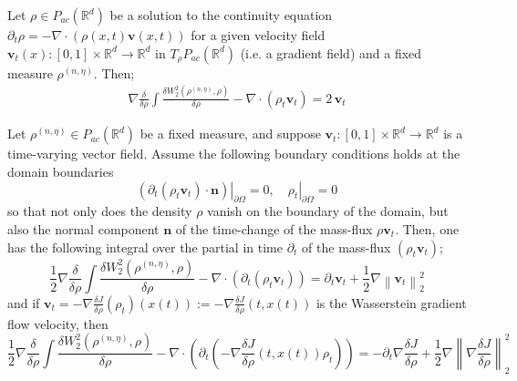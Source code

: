 \documentclass[10pt,a4paper]{amsart}
\newcommand{\wagrad}{\nabla \frac{\delta J}{\delta \rho}}
\begin{document}
\begin{prop}\label{prop:grad_first_var}
Let $\rho \in {P}_{ac}(\mathbb{R}^{d})$ be a solution to the continuity equation $\partial_{t} \rho =- \nabla \cdot (\rho(x,t) \mathbf{v}(x,t))$ for a given velocity field $\mathbf{v}_{t}(x): [0,1] \times \mathbb{R}^{d}  \to \mathbb{R}^{d}$ in $T_{\rho} P_{ac}(\mathbb{R}^{d})$ (i.e. a gradient field) and a fixed measure $\rho^{(n,\eta)}$. Then;
\begin{align*}
    \nabla \frac{\delta}{\delta \rho} \int \frac{\delta W_{2}^{2}(\rho^{(n,\eta)}, \rho) }{\delta \rho} -\nabla\cdot \left( \rho_{t} \mathbf{v}_t \right) = 2 \,\mathbf{v}_t
\end{align*}
\end{prop}

\begin{prop}
    Let $\rho^{(n,\eta)} \in {P}_{ac}(\mathbb{R}^{d})$ be a fixed measure, and suppose $\mathbf{v}_{t}: [0,1] \times \mathbb{R}^{d}  \to \mathbb{R}^{d}$ is a time-varying vector field. Assume the following boundary conditions holds at the domain boundaries
    \[ \left. \left( \partial_{t} ( \rho_{t} \mathbf{v}_{t} ) \cdot \bm{n}\right) \right|_{\partial \Omega}  = 0, \quad \left. \rho_{t} \right|_{\partial \Omega} = 0\]
so that not only does the density $\rho$ vanish on the boundary of the domain, but also the normal component $\bm{n}$ of the time-change of the mass-flux $\rho \mathbf{v}_{t}$. Then, one has the following integral over the partial in time $\partial_{t}$ of the mass-flux $(\rho_{t} \mathbf{v}_{t}  
    )$;
    \[
    \frac{1}{2}\nabla\frac{\delta}{\delta\rho} \int \frac{\delta W_{2}^{2}(\rho^{(n,\eta)}, \rho) }{\delta \rho} - \nabla\cdot\left( \partial_{t} (\rho_{t} \mathbf{v}_{t}  
    ) \right) = \partial_{t} \mathbf{v}_{t} +\frac{1}{2}\nabla \left\lVert \mathbf{v}_{t} \right\rVert_{2}^{2}
    \]
    and if $\mathbf{v}_{t} = - \wagrad (\rho_{t})(x(t)) := - \wagrad (t, x(t))$ is the Wasserstein gradient flow velocity, then
    \[
    \frac{1}{2}\nabla\frac{\delta}{\delta\rho} \int \frac{\delta W_{2}^{2}(\rho^{(n,\eta)}, \rho) }{\delta \rho} - \nabla\cdot\left( \partial_{t}  \left( - \wagrad (t, x(t)) \rho_{t}\right) \right) = - \partial_{t} \wagrad + \frac{1}{2}\nabla \left\lVert \wagrad \right\rVert_{2}^{2}
    \]
\end{prop}\label{prop:accn_HJ}
\end{document}
